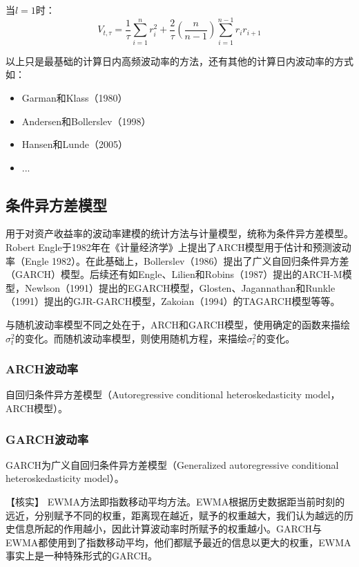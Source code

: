 \documentclass[11pt]{article}
\begin{document}
当$l=1$时：
\begin{equation*}
    V_{t,\tau} = \frac{1}{\tau}\sum_{i=1}^{n} r_i^2 + \frac{2}{\tau} \left( \frac{n}{n-1} \right) \sum_{i=1}^{n-1} r_i r_{i+1}
\end{equation*}

以上只是最基础的计算日内高频波动率的方法，还有其他的计算日内波动率的方式如：
\begin{itemize}
    \item Garman和Klass（1980）
    \item Andersen和Bollerslev（1998）
    \item Hansen和Lunde（2005）
    \item ...
\end{itemize}

\subsection{条件异方差模型}

用于对资产收益率的波动率建模的统计方法与计量模型，统称为条件异方差模型。Robert Engle于1982年在《计量经济学》上提出了ARCH模型用于估计和预测波动率（Engle 1982）。在此基础上，Bollerslev（1986）提出了广义自回归条件异方差（GARCH）模型。后续还有如Engle、Lilien和Robins（1987）提出的ARCH-M模型，Newlson（1991）提出的EGARCH模型，Glosten、Jagannathan和Runkle（1991）提出的GJR-GARCH模型，Zakoian（1994）的TAGARCH模型等等。

与随机波动率模型不同之处在于，ARCH和GARCH模型，使用确定的函数来描绘$\sigma_{t}^{2}$的变化。而随机波动率模型，则使用随机方程，来描绘$\sigma_{t}^{2}$的变化。

\subsubsection{ARCH波动率}

自回归条件异方差模型（Autoregressive conditional heteroskedasticity model，ARCH模型）。
\subsubsection{GARCH波动率}

GARCH为广义自回归条件异方差模型（Generalized autoregressive conditional heteroskedasticity model）。

【核实】
EWMA方法即指数移动平均方法。EWMA根据历史数据距当前时刻的远近，分别赋予不同的权重，距离现在越近，赋予的权重越大，我们认为越远的历史信息所起的作用越小，因此计算波动率时所赋予的权重越小。GARCH与EWMA都使用到了指数移动平均，他们都赋予最近的信息以更大的权重，EWMA事实上是一种特殊形式的GARCH。
\end{document}
